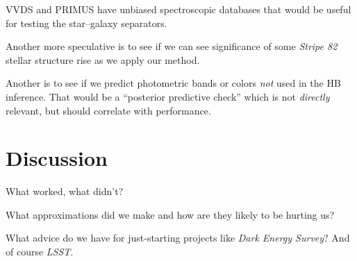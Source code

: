 \documentclass[12pt]{article}
\newcommand{\project}[1]{\textsl{#1}}
\begin{document}
VVDS and PRIMUS have unbiased spectroscopic databases that would be
useful for testing the star--galaxy separators. 

Another more speculative is to see if we can see significance of some
\project{Stripe 82} stellar structure rise as we apply our method.

Another is to see if we predict photometric bands or colors \emph{not}
used in the HB inference.  That would be a ``posterior predictive
check'' which is not \emph{directly} relevant, but should correlate
with performance.

\section{Discussion}

What worked, what didn't?

What approximations did we make and how are they likely to be hurting
us?

What advice do we have for just-starting projects like \project{Dark
  Energy Survey}?  And of course \project{LSST}.
\end{document}
